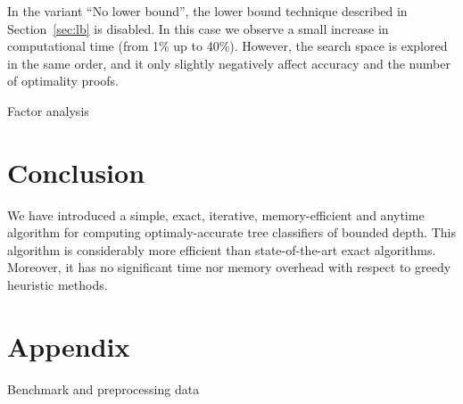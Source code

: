 \documentclass{llncs}
\begin{document}
In the variant ``No lower bound'', the lower bound technique described in Section~\ref{sec:lb} is disabled. In this case we observe a small increase in computational time (from 1\% up to 40\%). However, the search space is explored in the same order, and it only slightly negatively affect accuracy and the number of optimality proofs.

\begin{table}[htbp]
\begin{center}
\begin{footnotesize}
\tabcolsep=2pt

\end{footnotesize}
\end{center}
\caption{\label{tab:factor} Factor analysis}
\end{table}

% 


\section{Conclusion}

We have introduced a simple, exact, iterative, memory-efficient and anytime algorithm for computing optimaly-accurate tree classifiers of bounded depth.
This algorithm is considerably more efficient than state-of-the-art exact algorithms. Moreover, it has no significant time nor memory overhead with respect to greedy heuristic methods.







\clearpage


\section*{Appendix}

\renewcommand{\arraystretch}{.9}

\begin{table}[htbp]%
\begin{center}%
\begin{footnotesize}%
\tabcolsep=10pt%
%
\end{footnotesize}%
\end{center}%
\caption{\label{tab:info} Benchmark and preprocessing data}%
\end{table}%
\end{document}
